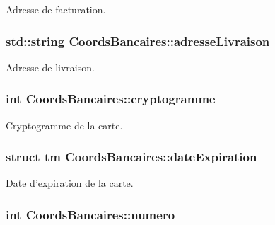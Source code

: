 Adresse de facturation. 

\hypertarget{class_coords_bancaires_ad5a8cb68047dcd80d5a51b28465197df}{
\subsubsection[{adresse\-Livraison}]{\setlength{\rightskip}{0pt plus 5cm}std\-::string Coords\-Bancaires\-::adresse\-Livraison\hspace{0.3cm}{\ttfamily [protected]}}}\label{class_coords_bancaires_ad5a8cb68047dcd80d5a51b28465197df}


Adresse de livraison. 

\hypertarget{class_coords_bancaires_af63951d077f5682efa2b3f3d469b8c95}{
\subsubsection[{cryptogramme}]{\setlength{\rightskip}{0pt plus 5cm}int Coords\-Bancaires\-::cryptogramme\hspace{0.3cm}{\ttfamily [protected]}}}\label{class_coords_bancaires_af63951d077f5682efa2b3f3d469b8c95}


Cryptogramme de la carte. 

\hypertarget{class_coords_bancaires_a51c54e20f3144261fdf534ec0bdac876}{
\subsubsection[{date\-Expiration}]{\setlength{\rightskip}{0pt plus 5cm}struct tm Coords\-Bancaires\-::date\-Expiration\hspace{0.3cm}{\ttfamily [protected]}}}\label{class_coords_bancaires_a51c54e20f3144261fdf534ec0bdac876}


Date d'expiration de la carte. 

\hypertarget{class_coords_bancaires_adabcd6ad108ed1345bebb08deb22ae17}{
\subsubsection[{numero}]{\setlength{\rightskip}{0pt plus 5cm}int Coords\-Bancaires\-::numero\hspace{0.3cm}{\ttfamily [protected]}}}\label{class_coords_bancaires_adabcd6ad108ed1345bebb08deb22ae17}


